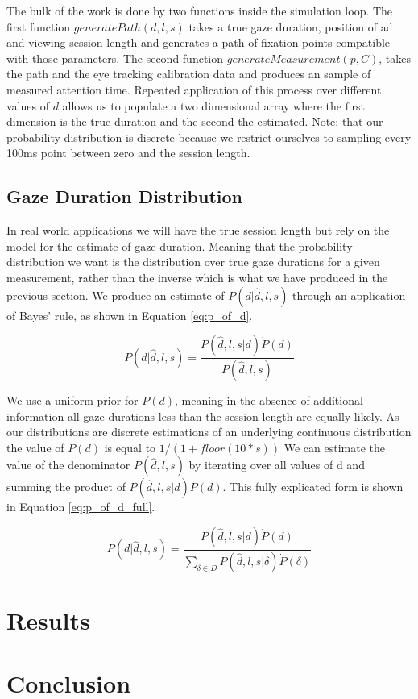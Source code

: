 \documentclass[12pt,a4paper]{article}
\numberwithin{equation}{section}
\begin{document}
The bulk of the work is done by two functions inside the simulation loop. The first function
$generatePath(d,l,s)$ takes a true gaze duration, position of ad and viewing session length and
generates a path of fixation points compatible with those parameters. The second function 
$generateMeasurement(p,C)$, takes the path and the eye tracking calibration data and produces
an sample of measured attention time. Repeated application of this process over different 
values of $d$ allows us to populate a two dimensional array where the first dimension is the
true duration and the second the estimated. Note: that our probability distribution is discrete
because we restrict ourselves to sampling every 100ms point between zero and the session length.

\subsection{Gaze Duration Distribution}

In real world applications we will have the true session length but rely on the model for the 
estimate of gaze duration. Meaning that the probability distribution we want is the distribution 
over true gaze durations for a given measurement, rather than the inverse which is what we 
have produced in the previous section. We produce an estimate of $P(d|\hat{d},l,s)$
through an application of Bayes' rule, as shown in Equation \ref{eq:p_of_d}.

\begin{equation}
\label{eq:p_of_d}
P(d|\hat{d},l,s) =  \frac{ P(\hat{d},l,s|d) \dot P(d) }{ P(\hat{d},l,s)  }
\end{equation}

We use a uniform prior for $P(d)$, meaning in the absence of additional information all
gaze durations less than the session length are equally likely. As our distributions are
discrete estimations of an underlying continuous distribution the value of $P(d)$ is
equal to $1/(1+floor(10*s))$
 We can estimate the value
of the denominator $P(\hat{d},l,s)$ by iterating over all values of d and summing the product
of $ P(\hat{d},l,s|d) \dot P(d)$. This fully explicated form is shown in 
Equation \ref{eq:p_of_d_full}.

\begin{equation}
\label{eq:p_of_d_full}
P(d|\hat{d},l,s) =  \frac{ P(\hat{d},l,s|d) \dot P(d) }{ \sum_{\delta \in D} P(\hat{d},l,s|\delta) \dot P(\delta)  }
\end{equation}


\section{Results}


\section{Conclusion}




\end{document}
